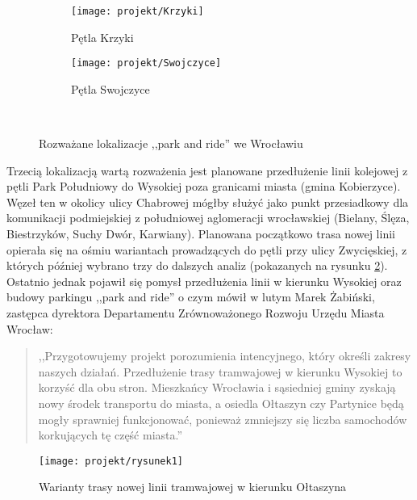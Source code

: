 \documentclass[twoside,12pt]{article}
\begin{document}
	\begin{figure}[H]
	\centering
	\begin{subfigure}{.49\textwidth}
	  \centering
	  \texttt{[image: projekt/Krzyki]}
	  \caption{Pętla Krzyki}
	\end{subfigure}%
	\begin{subfigure}{.49\textwidth}
	  \centering
	  \texttt{[image: projekt/Swojczyce]}
	  \caption{Pętla Swojczyce}
	\end{subfigure}
	\label{biuro}\\
	\caption{Rozważane lokalizacje ,,park and ride'' we Wrocławiu}
	\end{figure}	
	
	Trzecią lokalizacją wartą rozważenia jest planowane przedłużenie linii kolejowej z pętli Park Południowy do Wysokiej poza granicami miasta (gmina Kobierzyce). Węzeł ten w okolicy ulicy Chabrowej mógłby służyć jako punkt przesiadkowy dla komunikacji podmiejskiej z południowej aglomeracji wrocławskiej (Bielany, Ślęza, Biestrzyków, Suchy Dwór, Karwiany). Planowana początkowo trasa nowej linii opierała się na ośmiu wariantach prowadzących do pętli przy ulicy Zwycięskiej, z których później wybrano trzy do dalszych analiz (pokazanych na rysunku \ref{oltaszyn_trasa2}). Ostatnio jednak pojawił się pomysł przedłużenia linii w kierunku Wysokiej oraz budowy parkingu ,,park and ride'' o czym mówił w lutym Marek Żabiński, zastępca dyrektora Departamentu Zrównoważonego Rozwoju Urzędu Miasta Wrocław:
	\begin{quote}
	,,Przygotowujemy projekt porozumienia intencyjnego, który określi zakresy naszych działań. Przedłużenie trasy tramwajowej w kierunku Wysokiej to korzyść dla obu stron. Mieszkańcy Wrocławia i sąsiedniej gminy zyskają nowy środek transportu do miasta, a osiedla Ołtaszyn czy Partynice będą mogły sprawniej funkcjonować, ponieważ zmniejszy się liczba samochodów korkujących tę część miasta.'' \cite{oltaszyn} 
	\end{quote}
	
	\begin{figure}[H]
		\centering
		\texttt{[image: projekt/rysunek1]}\\
		\caption{Warianty trasy nowej linii tramwajowej w kierunku Ołtaszyna}
		\label{oltaszyn_trasa2}
	\end{figure}		
	
\end{document}
